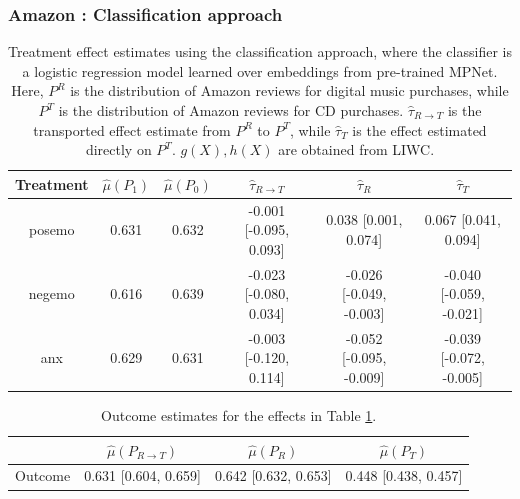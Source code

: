 \documentclass{article}
\begin{document}
\newpage
\subsubsection{Amazon \cite{przyant2021causal}: Classification approach}

\begin{table}[!ht]
    \centering
    \begin{tabular}{c|ccccc}
    \toprule
    Treatment   &   $\hat{\mu}(P_1)$ &   $\hat{\mu}(P_0)$ & $\hat{\tau}_{R \rightarrow T}$   & $\hat{\tau}_R$          & $\hat{\tau}_T$          \\
    \midrule
    posemo      &              0.631 &              0.632 & -0.001 [-0.095, 0.093]           & 0.038 [0.001, 0.074]    & 0.067 [0.041, 0.094]    \\
    negemo      &              0.616 &              0.639 & -0.023 [-0.080, 0.034]           & -0.026 [-0.049, -0.003] & -0.040 [-0.059, -0.021] \\
    anx         &              0.629 &              0.631 & -0.003 [-0.120, 0.114]           & -0.052 [-0.095, -0.009] & -0.039 [-0.072, -0.005] \\
    \bottomrule
    \end{tabular}
    \caption{Treatment effect estimates using the classification approach, where the classifier is a logistic regression model learned over embeddings from pre-trained MPNet. Here, $P^R$ is the distribution of Amazon reviews for digital music purchases, while $P^T$ is the distribution of Amazon reviews for CD purchases. $\hat{\tau}_{R \rightarrow T}$ is the transported effect estimate from $P^R$ to $P^T$, while $\hat{\tau}_T$ is the effect estimated directly on $P^T$. $g(X), h(X)$ are obtained from LIWC.}
    \label{tab:results_clf_mpnet_amazon_pryzant}
\end{table}

\begin{table}[!ht]
    \centering
    \begin{tabular}{c|ccc}
    \toprule
     & $\hat{\mu}(P_{R \rightarrow T})$   & $\hat{\mu}(P_R)$     & $\hat{\mu}(P_T)$     \\
     \midrule
     Outcome & 0.631 [0.604, 0.659]               & 0.642 [0.632, 0.653] & 0.448 [0.438, 0.457] \\
    \bottomrule
    \end{tabular}
    \caption{Outcome estimates for the effects in Table \ref{tab:results_clf_mpnet_amazon_pryzant}.}
    \label{tab:results_clf_mpnet_amazon_pryzant_outcome}
\end{table}
\end{document}
